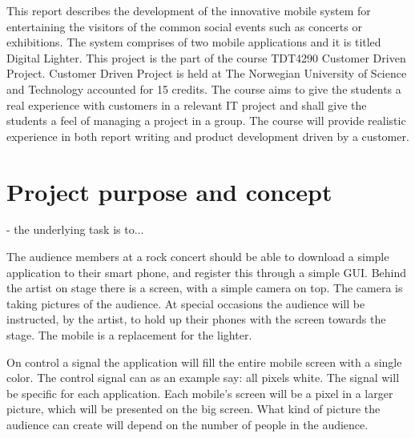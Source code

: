 This report describes the development of the innovative mobile system for entertaining the visitors of the common social events such as concerts or exhibitions. The system comprises of two mobile applications and it is titled Digital Lighter. This project is the part of the course TDT4290 Customer Driven Project. 
Customer Driven Project is held at The Norwegian University of Science and Technology accounted for 15 credits. The course aims to give the students a real experience with customers in a relevant IT project and shall give the students a feel of managing a project in a group. The course will provide realistic experience in both report writing and product development driven by a customer. 


\section{Project purpose and concept}
- the underlying task is to...

The audience members at a rock concert should be able to download a simple application to their smart phone, and register this through a simple GUI.
Behind the artist on stage there is a screen, with a simple camera on top. 
The camera is taking pictures of the audience. 
At special occasions the audience will be instructed, by the artist, to hold up their phones with the screen towards the stage. 
The mobile is a replacement for the lighter.  

On control a signal the application will fill the entire mobile screen with a single color.
The control signal can as an example say: all pixels white.
The signal will be specific for each application.
Each mobile's screen will be a pixel in a larger picture, which will be presented on the big screen. 
What kind of picture the audience can create will depend on the number of people in the audience. 

